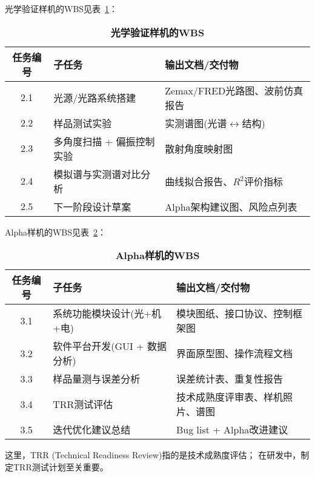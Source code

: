 光学验证样机的WBS见表~\ref{table:OFB_WBS}：
\begin{table}[h!]
\centering
\caption{\textbf{光学验证样机的WBS}}
\label{table:OFB_WBS}
\begin{tabular}{c|l|l}
\hline\hline
\textbf{任务编号} & \textbf{子任务} & \textbf{输出文档/交付物}  \\ \hline
2.1 & 光源/光路系统搭建 & Zemax/FRED光路图、波前仿真报告 \\ \hline
2.2 & 样品测试实验& 实测谱图(光谱$\leftrightarrow$结构) \\ \hline
2.3 & 多角度扫描 + 偏振控制实验 & 散射角度映射图 \\ \hline
2.4 & 模拟谱与实测谱对比分析 & 曲线拟合报告、$R^2$评价指标 \\ \hline
2.5 & 下一阶段设计草案 & Alpha架构建议图、风险点列表 \\
\hline\hline
\end{tabular}
\end{table}

Alpha样机的WBS见表~\ref{table:alpha_WBS}：
\begin{table}[h!]
\centering
\caption{\textbf{Alpha样机的WBS}}
\label{table:alpha_WBS}
\begin{tabular}{c|l|l}
\hline\hline
\textbf{任务编号} & \textbf{子任务} & \textbf{输出文档/交付物}  \\ \hline
3.1 & 系统功能模块设计(光+机+电) & 模块图纸、接口协议、控制框架图 \\ \hline
3.2 & 软件平台开发(GUI + 数据分析) & 界面原型图、操作流程文档 \\ \hline
3.3 & 样品量测与误差分析 & 误差统计表、重复性报告 \\ \hline
3.4 & TRR测试评估 & 技术成熟度评审表、样机照片、谱图 \\ \hline
3.5 & 迭代优化建议总结 & Bug list + Alpha改进建议 \\
\hline\hline
\end{tabular}
\end{table} 

这里，TRR (Technical Readiness Review)指的是技术成熟度评估；
在研发中，制定TRR测试计划至关重要。